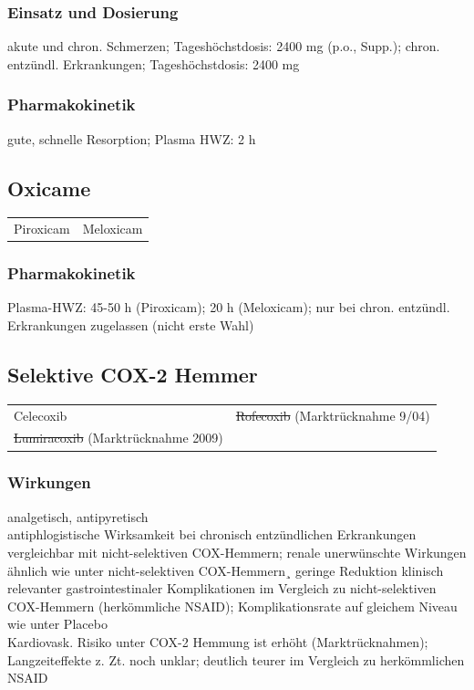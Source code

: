 \documentclass[10pt,a4paper]{report}
\begin{document}
\subsubsection{Einsatz und Dosierung} %
\label{par:einsatz_und_dosierung}
akute und chron. Schmerzen; Tageshöchstdosis: 2400 mg (p.o., Supp.); chron. entzündl. Erkrankungen; Tageshöchstdosis: 2400 mg
\subsubsection{Pharmakokinetik} %
\label{par:pharmakokinetik}
gute, schnelle Resorption; Plasma HWZ: 2 h 
\subsection{Oxicame} %
\label{sub:oxicame}
\begin{tabularx}{\textwidth}{XX}
Piroxicam&Meloxicam\\
\end{tabularx}
\subsubsection{Pharmakokinetik} %
\label{par:pharmakokinetik}
Plasma-HWZ: 45-50 h (Piroxicam); 20 h (Meloxicam); nur bei chron. entzündl. Erkrankungen zugelassen (nicht erste Wahl)
\subsection{Selektive COX-2 Hemmer} %
\begin{tabularx}{\textwidth}{XX}
Celecoxib&\sout{Rofecoxib} (Marktrücknahme 9/04)\\
\sout{Lumiracoxib} (Marktrücknahme 2009)&\\
\end{tabularx}
\subsubsection{Wirkungen} %
\label{par:wirkungen}
analgetisch, antipyretisch\\
antiphlogistische Wirksamkeit bei chronisch entzündlichen Erkrankungen vergleichbar mit nicht-selektiven COX-Hemmern; renale unerwünschte Wirkungen ähnlich wie unter nicht-selektiven COX-Hemmern¸ geringe Reduktion klinisch relevanter gastrointestinaler Komplikationen im Vergleich zu nicht-selektiven COX-Hemmern (herkömmliche NSAID); Komplikationsrate auf gleichem Niveau wie unter Placebo\\
Kardiovask. Risiko unter COX-2 Hemmung ist erhöht (Marktrücknahmen); Langzeiteffekte z. Zt. noch unklar; deutlich teurer im Vergleich zu herkömmlichen NSAID
\end{document}
